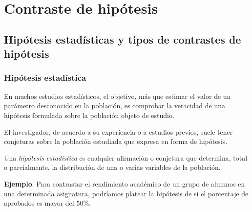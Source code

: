 \section{Contraste de hipótesis}



\subsection{Hipótesis estadísticas y tipos de contrastes de hipótesis}

\begin{frame}
\frametitle{Hipótesis estadística}
En muchos estudios estadísticos, el objetivo, más que estimar el valor de un parámetro desconocido en la población, es
comprobar la veracidad de una hipótesis formulada sobre la población objeto de estudio.

El investigador, de acuerdo a su experiencia o a estudios previos, suele tener conjeturas sobre la población estudiada
que expresa en forma de hipótesis.

\pause
\begin{definicion}
Una \emph{hipótesis estadística} es cualquier afirmación o conjetura que determina, total o parcialmente, la
distribución de una o varias variables de la población.
\end{definicion}

\pause
\textbf{Ejemplo}. Para contrastar el rendimiento académico de un grupo de alumnos en una determinada asignatura,
podríamos platear la hipótesis de si el porcentaje de aprobados es mayor del $50\%$.
\end{frame}


